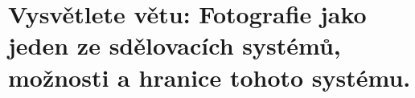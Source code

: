 \section{Vysvětlete větu: Fotografie jako jeden ze sdělovacích systémů, možnosti a hranice tohoto systému.}